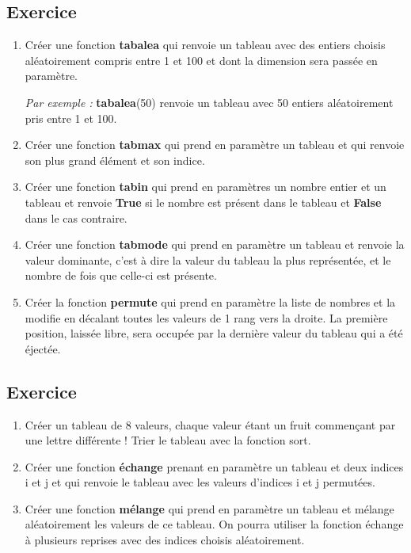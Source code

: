 \documentclass[11pt,a4paper]{article}
\newcounter{numexo}
\begin{document}
\addtocounter{numexo}{1}
\subsection*{\Large Exercice \thenumexo}
\begin{enumerate}
\item Créer une fonction \textbf{tabalea} qui renvoie un tableau avec des entiers choisis aléatoirement compris entre 1 et 100 et dont la dimension sera passée en paramètre. 

\textit{Par exemple :} \textbf{tabalea}(50) renvoie un tableau avec 50 entiers aléatoirement pris entre 1 et 100.
\item Créer une fonction \textbf{tabmax} qui prend en paramètre un tableau et qui renvoie son plus grand élément et son indice.
\item Créer une fonction \textbf{tabin} qui prend en paramètres un nombre entier et un tableau et renvoie \textbf{True} si le nombre est présent dans le tableau et \textbf{False} dans le cas contraire.
\item Créer une fonction \textbf{tabmode} qui prend en paramètre un tableau et renvoie la valeur dominante, c'est à dire la valeur du tableau la plus représentée, et le nombre de fois que celle-ci est présente.
\item Créer la fonction \textbf{permute} qui prend en paramètre la liste de nombres et la modifie en décalant toutes les valeurs de 1 rang vers la droite. La première position, laissée libre, sera occupée par la dernière valeur du tableau qui a été éjectée.  
\end{enumerate}


\addtocounter{numexo}{1}
\subsection*{\Large Exercice \thenumexo }
\begin{enumerate}
\item Créer un tableau de 8 valeurs, chaque valeur étant un fruit commençant par une lettre différente ! Trier le tableau avec la fonction sort.
\item Créer une fonction \textbf{échange} prenant en paramètre un tableau et deux indices i et j et qui renvoie le tableau avec les valeurs d'indices i et j permutées.
\item Créer une fonction \textbf{mélange} qui prend en paramètre un tableau et mélange aléatoirement les valeurs de ce tableau. On pourra utiliser la fonction échange à plusieurs reprises avec des indices choisis aléatoirement.
\end{enumerate}
\end{document}
